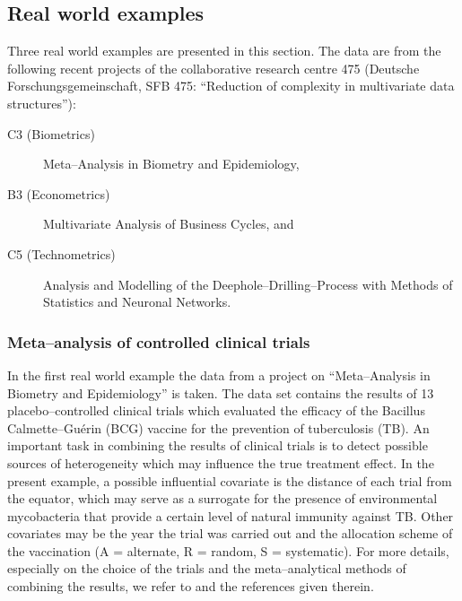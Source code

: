 \clearpage
\subsection{Real world examples\label{realworld}}
Three real world examples are presented in this section.
The data are from the following recent projects of the collaborative
research centre 475
(Deutsche Forschungsgemeinschaft, SFB 475:
 ``Reduction of complexity in multivariate data structures''):

\vspace{-5mm}\begin{description}
\item[C3 \textmd{(Biometrics)}] Meta--Analysis in Biometry and Epidemiology,
\item[B3 \textmd{(Econometrics)}] Multivariate Analysis of Business Cycles, and
\item[C5 \textmd{(Technometrics)}]
    Analysis and Modelling of the Deephole--Drilling--Process with Methods of Statistics and Neuronal Networks.
\end{description}


\subsubsection{Meta--analysis of controlled clinical trials\label{meta}}
In the first real world example the data from a project on ``Meta--Analysis
in Biometry and Epidemiology'' is taken.
The data set contains the results of 13 placebo--controlled clinical trials
which evaluated the efficacy of the Bacillus Calmette--Gu\'{e}rin (BCG)
vaccine for the prevention of tuberculosis (TB).
%
An important task in combining the results of clinical trials is to detect
possible sources of heterogeneity which may influence the true treatment
effect.
%
In the present example, a possible influential covariate is the distance of
each trial from the equator, which may serve as a surrogate for the
presence of environmental mycobacteria that provide a certain level of
natural immunity against TB.
%
Other covariates may be the year the trial was carried out and the
allocation scheme of the vaccination
(A = alternate, R = random, S = systematic).
For more details, especially on the choice of the trials and the
meta--analytical methods of combining the results, we refer to
 and the references given therein.

